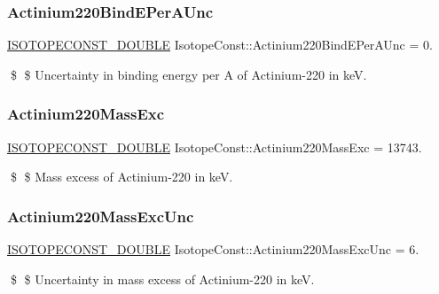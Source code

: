 \subsubsection{\texorpdfstring{Actinium220\+Bind\+E\+Per\+A\+Unc}{Actinium220BindEPerAUnc}}
{\footnotesize\ttfamily \mbox{\hyperlink{group___isotope_const-_macros_ga8f45a7272ce02c0b4c65c44636ed719a}{I\+S\+O\+T\+O\+P\+E\+C\+O\+N\+S\+T\+\_\+\+D\+O\+U\+B\+LE}} Isotope\+Const\+::\+Actinium220\+Bind\+E\+Per\+A\+Unc = 0.}

\$ \$ Uncertainty in binding energy per A of Actinium-\/220 in keV. \mbox{\label{group___isotope_const-_actinium-_ac220_gab0c184591ad2250ce7727e2d6af1dea4}} 
\subsubsection{\texorpdfstring{Actinium220\+Mass\+Exc}{Actinium220MassExc}}
{\footnotesize\ttfamily \mbox{\hyperlink{group___isotope_const-_macros_ga8f45a7272ce02c0b4c65c44636ed719a}{I\+S\+O\+T\+O\+P\+E\+C\+O\+N\+S\+T\+\_\+\+D\+O\+U\+B\+LE}} Isotope\+Const\+::\+Actinium220\+Mass\+Exc = 13743.}

\$ \$ Mass excess of Actinium-\/220 in keV. \mbox{\label{group___isotope_const-_actinium-_ac220_ga1f4725d811d2b48909ab8e6f521e308e}} 
\subsubsection{\texorpdfstring{Actinium220\+Mass\+Exc\+Unc}{Actinium220MassExcUnc}}
{\footnotesize\ttfamily \mbox{\hyperlink{group___isotope_const-_macros_ga8f45a7272ce02c0b4c65c44636ed719a}{I\+S\+O\+T\+O\+P\+E\+C\+O\+N\+S\+T\+\_\+\+D\+O\+U\+B\+LE}} Isotope\+Const\+::\+Actinium220\+Mass\+Exc\+Unc = 6.}

\$ \$ Uncertainty in mass excess of Actinium-\/220 in keV. \mbox{\label{group___isotope_const-_actinium-_ac220_ga677626bef942e1b55be904f4fec3e589}} 
